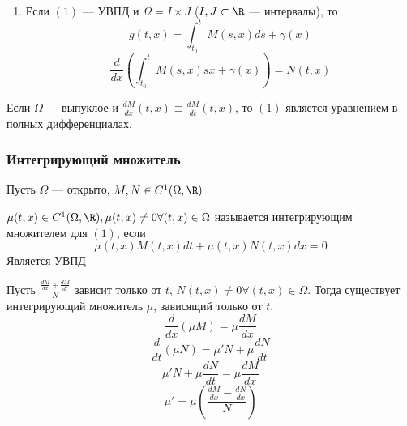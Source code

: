 \begin{enumerate}
    \item Если \((1)\) --- УВПД и \(\Omega = I \times J\) (\(I, J \subset \R\) --- интервалы), то
    \[g(t, x) = \int_{t_0}^t M(s, x)ds + \gamma(x)\]
    \[\frac{d}{dx}\left(\int_{t_0}^t M(s, x)sx + \gamma(x)\right) = N(t, x)\]
\end{enumerate}

\begin{theorem}
    Если \(\Omega\) --- выпуклое и \(\frac{dM}{dx}(t, x) \equiv \frac{dM}{dt}(t, x)\), то \((1)\) является уравнением в полных дифференциалах.
\end{theorem}

\subsubsection{Интегрирующий множитель}
Пусть \(\Omega\) --- открыто, \(M, N \in C^1(\Omega, \R)\)
\begin{definition}
    \(\mu(t, x) \in C^1(\Omega, \R), \mu(t, x) \ne 0 \forall (t, x) \in \Omega\) называется интегрирующим множителем для \((1)\), если 
    \[\mu(t, x)M(t, x)dt + \mu(t, x)N(t, x)dx = 0\]
    Является УВПД
\end{definition}

\begin{proposition}
    Пусть \(\frac{\frac{dM}{dx} + \frac{dM}{dt}}{N}\) зависит только от \(t\), \(N(t, x) \ne 0 \forall (t, x) \in \Omega\). Тогда существует интегрирующий множитель \(\mu\), зависящий только от \(t\).
    \[\frac{d}{dx}(\mu M) = \mu \frac{dM}{dx}\]
    \[\frac{d}{dt}(\mu N) = \mu' N + \mu \frac{dN}{dt}\]
    \[\mu'N + \mu \frac{dN}{dt} = \mu \frac{dM}{dx}\]
    \[\mu' = \mu\left(\frac{\frac{dM}{dx} - \frac{dN}{dx}}{N}\right)\]
\end{proposition}
